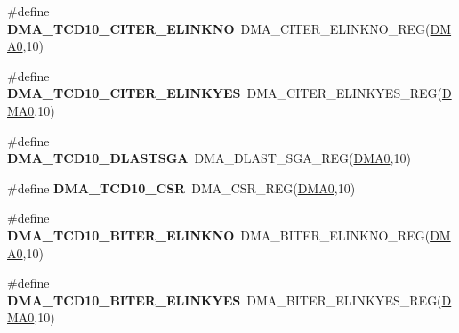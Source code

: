\begin{DoxyCompactItemize}
\item 
\#define {\bfseries D\+M\+A\+\_\+\+T\+C\+D10\+\_\+\+C\+I\+T\+E\+R\+\_\+\+E\+L\+I\+N\+K\+NO}~D\+M\+A\+\_\+\+C\+I\+T\+E\+R\+\_\+\+E\+L\+I\+N\+K\+N\+O\+\_\+\+R\+EG(\hyperlink{group__DMA__Peripheral__Access__Layer_ga4103044f9ca209772f513dc694513ffb}{D\+M\+A0},10)\hypertarget{group__DMA__Register__Accessor__Macros_gacb96c7d83ed3e4a7d09e164668dbfb40}{}\label{group__DMA__Register__Accessor__Macros_gacb96c7d83ed3e4a7d09e164668dbfb40}

\item 
\#define {\bfseries D\+M\+A\+\_\+\+T\+C\+D10\+\_\+\+C\+I\+T\+E\+R\+\_\+\+E\+L\+I\+N\+K\+Y\+ES}~D\+M\+A\+\_\+\+C\+I\+T\+E\+R\+\_\+\+E\+L\+I\+N\+K\+Y\+E\+S\+\_\+\+R\+EG(\hyperlink{group__DMA__Peripheral__Access__Layer_ga4103044f9ca209772f513dc694513ffb}{D\+M\+A0},10)\hypertarget{group__DMA__Register__Accessor__Macros_ga4a9afa879af2aa3200e1f24dd95c92de}{}\label{group__DMA__Register__Accessor__Macros_ga4a9afa879af2aa3200e1f24dd95c92de}

\item 
\#define {\bfseries D\+M\+A\+\_\+\+T\+C\+D10\+\_\+\+D\+L\+A\+S\+T\+S\+GA}~D\+M\+A\+\_\+\+D\+L\+A\+S\+T\+\_\+\+S\+G\+A\+\_\+\+R\+EG(\hyperlink{group__DMA__Peripheral__Access__Layer_ga4103044f9ca209772f513dc694513ffb}{D\+M\+A0},10)\hypertarget{group__DMA__Register__Accessor__Macros_gaf1953e0548e3e985d1132f7c5751734b}{}\label{group__DMA__Register__Accessor__Macros_gaf1953e0548e3e985d1132f7c5751734b}

\item 
\#define {\bfseries D\+M\+A\+\_\+\+T\+C\+D10\+\_\+\+C\+SR}~D\+M\+A\+\_\+\+C\+S\+R\+\_\+\+R\+EG(\hyperlink{group__DMA__Peripheral__Access__Layer_ga4103044f9ca209772f513dc694513ffb}{D\+M\+A0},10)\hypertarget{group__DMA__Register__Accessor__Macros_ga105f12de22dcf7bd42da746bf250ed09}{}\label{group__DMA__Register__Accessor__Macros_ga105f12de22dcf7bd42da746bf250ed09}

\item 
\#define {\bfseries D\+M\+A\+\_\+\+T\+C\+D10\+\_\+\+B\+I\+T\+E\+R\+\_\+\+E\+L\+I\+N\+K\+NO}~D\+M\+A\+\_\+\+B\+I\+T\+E\+R\+\_\+\+E\+L\+I\+N\+K\+N\+O\+\_\+\+R\+EG(\hyperlink{group__DMA__Peripheral__Access__Layer_ga4103044f9ca209772f513dc694513ffb}{D\+M\+A0},10)\hypertarget{group__DMA__Register__Accessor__Macros_ga72c8aa9c1103e0a6d92468dcb8cd26f7}{}\label{group__DMA__Register__Accessor__Macros_ga72c8aa9c1103e0a6d92468dcb8cd26f7}

\item 
\#define {\bfseries D\+M\+A\+\_\+\+T\+C\+D10\+\_\+\+B\+I\+T\+E\+R\+\_\+\+E\+L\+I\+N\+K\+Y\+ES}~D\+M\+A\+\_\+\+B\+I\+T\+E\+R\+\_\+\+E\+L\+I\+N\+K\+Y\+E\+S\+\_\+\+R\+EG(\hyperlink{group__DMA__Peripheral__Access__Layer_ga4103044f9ca209772f513dc694513ffb}{D\+M\+A0},10)\hypertarget{group__DMA__Register__Accessor__Macros_ga79afca17304b865c762c118811ecf7be}{}\label{group__DMA__Register__Accessor__Macros_ga79afca17304b865c762c118811ecf7be}


\end{DoxyCompactItemize}
